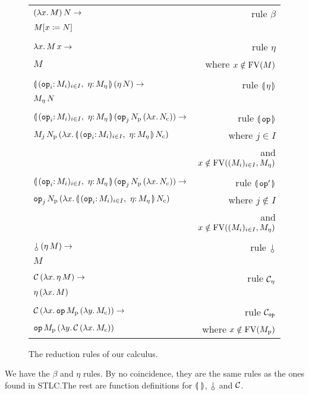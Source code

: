 \documentclass{llncs}
\begin{document}
\begin{figure}
  \centering
  \begin{tabular}{lr}
  $(\lambda x.\, M)\,N \to$ & rule $\beta$ \\
  $M[x \coloneqq N]$ & \\
  \\
  $\lambda x.\, M\,x \to$ & rule $\eta$ \\
  $M$ & where $x \notin \operatorname{FV}(M)$ \\
  \\
  $\ap{\cibanana}{(\ap{\eta}{N})} \to$ & rule $\llparenthesis \, \eta \, \rrparenthesis$ \\
  $M_\eta\,N$ & \\
  \\
  $\ap{\cibanana}{(\ap{\ap{\op{op}_j}{N_{\mathrm{p}}}}{(\lam{x}{N_{\mathrm{c}}})})} \to$ & rule $\llparenthesis \, \mathtt{op} \, \rrparenthesis$ \\
  $\ap{M_j}{\ap{N_{\mathrm{p}}}{(\lam{x}{\ap{\cibanana}{N_{\mathrm{c}}}})}}$
  & where $j \in I$ \\
  & and $x \notin \operatorname{FV}((M_i)_{i \in I}, M_\eta)$ \\
  \\
  $\ap{\cibanana}{(\ap{\ap{\op{op}_j}{N_{\mathrm{p}}}}{(\lam{x}{N_{\mathrm{c}}})})} \to$ & rule $\llparenthesis \, \mathtt{op}' \, \rrparenthesis$ \\
  $\ap{\op{op}_j}{\ap{N_{\mathrm{p}}}{(\lam{x}{\ap{\cibanana}{N_{\mathrm{c}}}})}}$
  & where $j \notin I$ \\
  & and $x \notin \operatorname{FV}((M_i)_{i \in I}, M_\eta)$ \\
  \\
  $\ap{\cherry}{(\ap{\eta}{M})} \to$ & rule $\cherry$ \\
  $M$ & \\
  \\
  $\mathcal{C}\,(\lambda x.\, \eta\,M) \to$ & rule $\mathcal{C}_\eta$ \\
  $\eta\,(\lambda x.\, M)$ & \\
  \\
  $\mathcal{C}\,(\lambda x.\, \mathtt{op}\,M_{\mathrm{p}}\,(\lambda y.\, M_{\mathrm{c}})) \to$ & rule $\mathcal{C}_{\mathtt{op}}$ \\
  $\mathtt{op}\,M_{\mathrm{p}}\,(\lambda y.\, \mathcal{C}\,(\lambda x.\, M_{\mathrm{c}}))$
  & where $x \notin \operatorname{FV}(M_{\mathrm{p}})$
  \end{tabular}
  
  \caption{\label{fig:reductions} The reduction rules of our calculus.}
\end{figure}

We have the $\beta$ and $\eta$ rules. By no coincidence, they are the same
rules as the ones found in STLC.\@ The rest are function definitions for
$\llparenthesis \,  \, \rrparenthesis$, $\cherry$ and $\mathcal{C}$.
\end{document}
